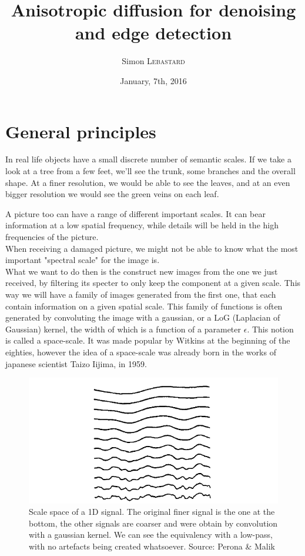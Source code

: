 \documentclass[12pt,a4paper]{book}
\begin{document}
	
	
	\title{Anisotropic diffusion for denoising and edge detection}
	\author{Simon \textsc{Lebastard}}
	\date{January, 7th, 2016}
	
\maketitle
	
\section{General principles}

In real life objects have a small discrete number of semantic scales. If we take a look at a tree from a few feet, we'll see the trunk, some branches and the overall shape. At a finer resolution, we would be able to see the leaves, and at an even bigger resolution we would see the green veins on each leaf.

A picture too can have a range of different important scales. It can bear information at a low spatial frequency, while details will be held in the high frequencies of the picture.\\
When receiving a damaged picture, we might not be able to know what the most important "spectral scale" for the image is.
\\
What we want to do then is the construct new images from the one we just received, by filtering its specter to only keep the component at a given scale. This way we will have a family of images generated from the first one, that each contain information on a given spatial scale. This family of functions is often generated by convoluting the image with a gaussian, or a LoG (Laplacian of Gaussian) kernel, the width of which is a function of a parameter $\epsilon$. This notion is called a space-scale. It was made popular by Witkins at the beginning of the eighties, however the idea of a space-scale was already born in the works of japanese scientist Taizo Iijima, in 1959.
\\
\begin{figure}
	\caption{Scale space of a 1D signal. The original finer signal is the one at the bottom, the other signals are coarser and were obtain by convolution with a gaussian kernel. We can see the equivalency with a low-pass, with no artefacts being created whatsoever. Source: Perona \& Malik}
	\includegraphics{ScaleSpace_Example.png}
\end{figure}
\end{document}

